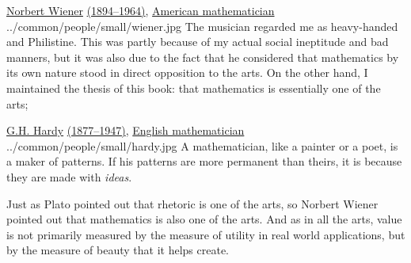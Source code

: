 \qboxnpq
  {\href{http://en.wikipedia.org/wiki/Norbert_Wiener}{Norbert Wiener}
   \href{http://www-history.mcs.st-andrews.ac.uk/Timelines/TimelineG.html}{(1894--1964)},
   \href{http://www-history.mcs.st-andrews.ac.uk/BirthplaceMaps/Places/USA.html}{American mathematician}
    \footnotemark
  }
  {../common/people/small/wiener.jpg}
  {The musician regarded me as heavy-handed and Philistine.
   This was partly because of my actual social ineptitude and bad manners,
   but it was also due to the fact that he considered that mathematics
   by its own nature stood in direct opposition to the arts.
   On the other hand, I maintained the thesis of this book:
   that mathematics is essentially one of the arts;}


\qboxnps
  {\href{http://en.wikipedia.org/wiki/G._H._Hardy}{G.H. Hardy}
   \href{http://www-history.mcs.st-andrews.ac.uk/Timelines/TimelineG.html}{(1877--1947)},
   \href{http://www-history.mcs.st-andrews.ac.uk/BirthplaceMaps/Places/UK.html}{English mathematician}
    \footnotemark
  }
  {../common/people/small/hardy.jpg}
  {A mathematician, like a painter or a poet, is a maker of patterns.
   If his patterns are more permanent than theirs,
   it is because they are made with \emph{ideas}.}




Just as Plato pointed out that rhetoric is
one of the arts,
so Norbert Wiener pointed out that mathematics is also
one of the arts.
And as in all the arts, value is not primarily measured by
the measure of utility in real world applications,
but by the measure of beauty that it helps create.




